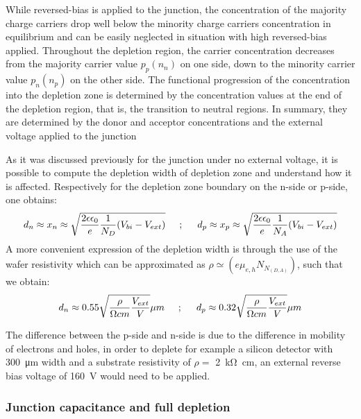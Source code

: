 	While reversed-bias is applied to the junction, the concentration of the majority charge carriers drop well below the minority charge carriers concentration in equilibrium and can be easily neglected in situation with high reversed-bias applied. Throughout the depletion region, the carrier concentration decreases from the majority carrier value $p_p (n_n)$ on one side, down to the minority carrier value $p_n (n_p)$ on the other side. The functional progression of the concentration into the depletion zone is determined by the concentration values at the end of the depletion region, that is, the transition to neutral regions. In summary, they are determined by the donor and acceptor concentrations and the external voltage applied to the junction\ \cite{detectors} 

	As it was discussed previously for the junction under no external voltage, it is possible to compute the depletion width of depletion zone and understand how it is affected. Respectively for the depletion zone boundary on the n-side or p-side, one obtains: 
	\begin{equation}
		d_{n} \approx x_n \approx \sqrt{\frac{2 \epsilon \epsilon_0}{e} \frac{1}{N_D}(V_{bi} - V_{ext})} \hspace{5mm} ; \hspace{5mm} d_{p} \approx x_p \approx \sqrt{\frac{2 \epsilon \epsilon_0}{e} \frac{1}{N_A}(V_{bi} - V_{ext})}
	\end{equation}
	A more convenient expression of the depletion width is through the use of the wafer resistivity which can be approximated as $\rho \simeq (e \mu_{e,h} N_{N_(D,A)})$, such that we obtain: 
	\begin{equation}
		d_n \approx 0.55 \sqrt{\frac{\rho}{\Omega cm} \frac{V_{ext}}{V}} \mu m \hspace{5mm} ; \hspace{5mm} d_{p} \approx 0.32 \sqrt{\frac{\rho}{\Omega cm} \frac{V_{ext}}{V}}  \mu m
		\label{eq:depletion_width}
	\end{equation}

	The difference between the p-side and n-side is due to the difference in mobility of electrons and holes, in order to deplete for example a silicon detector with \SI{300}{\micro\meter} width and a substrate resistivity of $\rho = $ \SI{2}{\kilo\ohm\centi\meter}, an external reverse bias voltage of \SI{160}{\volt} would need to be applied. 
\clearpage
	\subsubsection{Junction capacitance and full depletion}
		
